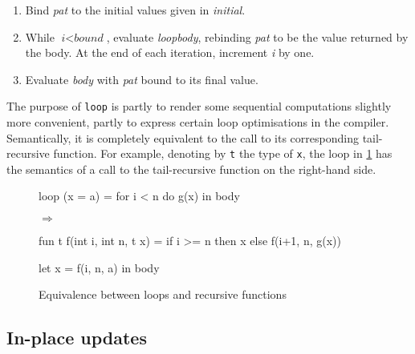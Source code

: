 \begin{enumerate}
  \item Bind \textit{pat} to the initial values given in \textit{initial}.
  \item While $\textit{i} < \textit{bound}$, evaluate
    \textit{loopbody}, rebinding \textit{pat} to be the value returned
    by the body.  At the end of each iteration, increment \textit{i}
    by one.
  \item Evaluate \textit{body} with \textit{pat} bound to its final
    value.
\end{enumerate}
The purpose of \texttt{loop} is partly to render some sequential
computations slightly more convenient, partly to express certain loop
optimisations in the compiler.  Semantically, it is completely
equivalent to the call to its corresponding tail-recursive function.
For example, denoting by \texttt{t} the type of \texttt{x}, the loop
in \cref{fig:loop-recursion} has the semantics of a call to the
tail-recursive function on the right-hand side.

\begin{figure}
\begin{center}
\begin{minipage}{0.3\columnwidth}
\begin{colorcode}
loop (x = a) =
  for i < n do
    g(x)
in body
\end{colorcode}
\end{minipage}
\begin{minipage}{0.05\columnwidth}
$\Rightarrow$
\end{minipage}
\begin{minipage}{0.4\columnwidth}
\begin{colorcode}
fun t f(int i, int n, t x) =
  if i >= n then x
     else f(i+1, n, g(x))

let x = f(i, n, a)
in body
\end{colorcode}
\end{minipage}
\end{center}
\caption{Equivalence between loops and recursive functions}
\label{fig:loop-recursion}
\end{figure}

\subsection{In-place updates}

